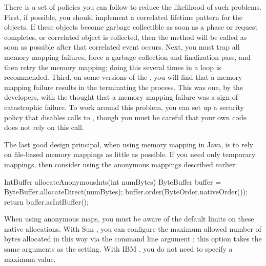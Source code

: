 There is a set of policies you can follow to reduce the likelihood of such
problems. First, if possible, you should implement a correlated lifetime pattern
for the  objects. If these objects become garbage collectible
as soon as a phase or request completes, or correlated object is collected, then
the  method will be called as soon as possible after
that correlated event occurs. Next, you must trap all memory mapping failures,
force a garbage collection and finalization pass, and then retry the memory
mapping; doing this several times in a loop is recommended. Third, on some
versions of the \jre, you will find that a memory mapping failure results in the
\jre terminating the process. This was one, by the \jre developers, with the
thought that a memory mapping failure was a sign of catastrophic failure.
To work around this problem, you can set up a security policy that disables
calls to , though you must be careful that your own code does
not rely on this call.

The last good design principal, when using memory mapping in Java, is to rely on
file-based memory mappings as little as possible. If you need only temporary
mappings, then consider using the anonymous mappings described earlier:
\begin{shortlisting}
IntBuffer allocateAnonymousInts(int numBytes) {
   ByteBuffer buffer = ByteBuffer.allocateDirect(numBytes);
   buffer.order(ByteOrder.nativeOrder());
   return buffer.asIntBuffer();
}
\end{shortlisting}
When using anonymous maps, you must be aware of the default limits on these
native allocations. With Sun \jres, you can configure the maximum allowed number
of bytes allocated in this way via the command line argument
; this option takes the same arguments as the
 setting. With IBM \jres, you do not need to specify a maximum value.


